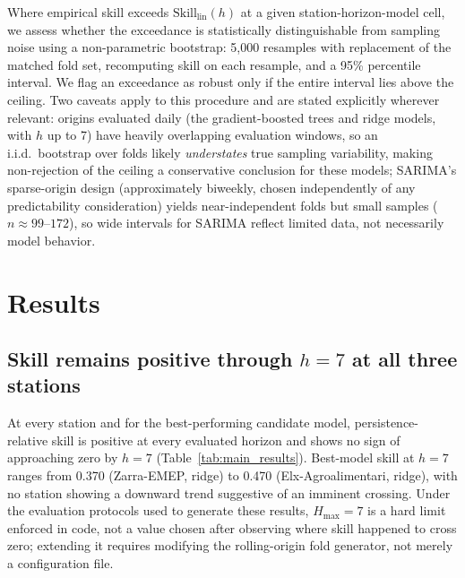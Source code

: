 \documentclass{article}
\begin{document}
Where empirical skill exceeds $\mathrm{Skill}_{\mathrm{lin}}(h)$ at a given
station-horizon-model cell, we assess whether the exceedance is statistically
distinguishable from sampling noise using a non-parametric bootstrap: 5{,}000
resamples with replacement of the matched fold set, recomputing skill on each
resample, and a 95\% percentile interval.
We flag an exceedance as robust only if the entire interval lies above the
ceiling.
Two caveats apply to this procedure and are stated explicitly wherever
relevant: origins evaluated daily (the gradient-boosted trees and ridge
models, with $h$ up to 7) have heavily overlapping evaluation windows, so an
i.i.d.\ bootstrap over folds likely \emph{understates} true sampling
variability, making non-rejection of the ceiling a conservative conclusion for
these models; SARIMA's sparse-origin design (approximately biweekly, chosen
independently of any predictability consideration) yields near-independent
folds but small samples ($n\approx 99$--$172$), so wide intervals for SARIMA
reflect limited data, not necessarily model behavior.

\section{Results}
\label{sec:results}

\subsection{Skill remains positive through $h=7$ at all three stations}

At every station and for the best-performing candidate model, persistence-
relative skill is positive at every evaluated horizon and shows no sign of
approaching zero by $h=7$ (Table~\ref{tab:main_results}).
Best-model skill at $h=7$ ranges from 0.370 (Zarra-EMEP, ridge) to 0.470
(Elx-Agroalimentari, ridge), with no station showing a downward trend
suggestive of an imminent crossing.
Under the evaluation protocols used to generate these results, $H_{\max}=7$
is a hard limit enforced in code, not a value chosen after observing where
skill happened to cross zero; extending it requires modifying the
rolling-origin fold generator, not merely a configuration file.
\end{document}
